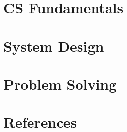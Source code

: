 \section[CS]{CS Fundamentals}

	
	
	

\section[Sys]{System Design}

	
	

\section[Probs]{Problem Solving}
	


\section[Refs]{References}
	

